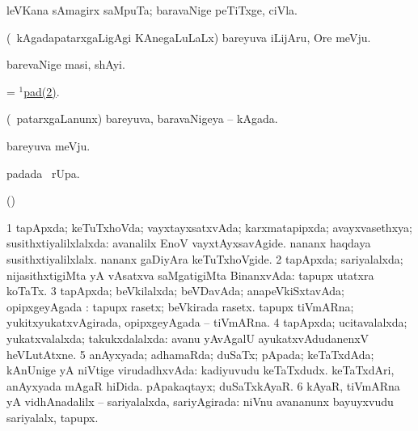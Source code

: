 \bentry
{} 
\gl{\nA}
\expl{}
\bmng
leVKana sAmagirx saMpuTa; baravaNige peTiTxge, ciVla. 
\emng
\eentry

\bentry
{} 
\gl{\nA}
\expl{}
\bmng
(\kanmu\ kAgadapatarxgaLigAgi KAnegaLuLaLx) bareyuva iLijAru, Ore meVju. 
\emng
\eentry

\bentry
{} 
\gl{\nA}
\expl{}
\bmng
barevaNige masi, shAyi. 
\emng
\eentry

\bentry
{} 
\gl{\nA}
\expl{}
\bmng
= \hyperref{kandict_p.pdf}{P}{pad(1)2}{$^1$pad(2)}. 
\emng
\eentry

\bentry
{} 
\gl{\nA}
\expl{}
\bmng
(\kanmu\ patarxgaLanunx) bareyuva, baravaNigeya -- kAgada. 
\emng
\eentry

\bentry
{} 
\gl{\nA}
\expl{}
\bmng
bareyuva meVju. 
\emng
\eentry

\bentry
{} 
\gl{\kirx}
\expl{}
\bmng
{} padada \BUkaq\ rUpa. 
\emng
\eentry

\bentry
{} 
\gl{\saMkiSx}
\expl{}
\bmng
(\UK)  
\emng
\eentry

\bentry
{} 
\gl{\gu}
\expl{}
\bmng
\bnum
\num{1} tapApxda; keTuTxhoVda; vayxtayxsatxvAda; karxmatapipxda; avayxvasethxya; susithxtiyalilxlalxda:  avanalilx EnoV vayxtAyxsavAgide.  nananx haqdaya susithxtiyalilxlalx.  nananx gaDiyAra keTuTxhoVgide. 
\num{2} tapApxda; sariyalalxda; nijasithxtigiMta yA vAsatxva saMgatigiMta BinanxvAda:  tapupx utatxra koTaTx. 
\num{3} tapApxda; beVkilalxda; beVDavAda; anapeVkiSxtavAda; opipxgeyAgada :  tapupx rasetx; beVkirada rasetx.  tapupx tiVmARna; yukitxyukatxvAgirada, opipxgeyAgada -- tiVmARna. 
\num{4} tapApxda; ucitavalalxda; yukatxvalalxda; takukxdalalxda:  avanu yAvAgalU ayukatxvAdudanenxV heVLutAtxne. 
\num{5} anAyxyada; adhamaRda; duSaTx; pApada; keTaTxdAda; kAnUnige yA niVtige virudadhxvAda:  kadiyuvudu keTaTxdudx.  keTaTxdAri, anAyxyada mAgaR hiDida.  pApakaqtayx; duSaTxkAyaR. 
\num{6} kAyaR, tiVmARna yA vidhAnadalilx -- sariyalalxda, sariyAgirada:  niVnu avananunx bayuyxvudu sariyalalx, tapupx. 
\enum
\emng

